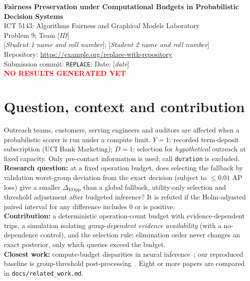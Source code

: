 \documentclass[11pt,a4paper]{article}
\newcommand{\fillin}[1]{\textnormal{[\textit{#1}]}}
\newcommand{\ProjectTitle}{Fairness Preservation under Computational Budgets in Probabilistic Decision Systems}
\newcommand{\resBanner}{\textcolor{red}{\textbf{NO RESULTS GENERATED YET}}}
\newcommand{\resEffectGlobal}{[pending]}\newcommand{\resEffectUtil}{[pending]}\newcommand{\resEffectThr}{[pending]}
\begin{document}
\begin{center}
{\Large\bfseries \ProjectTitle}\\[4pt]
ICT 5143: Algorithms Fairness and Graphical Models Laboratory\\
Problem 9; Team \fillin{ID}\\
\fillin{Student 1 name and roll number}; \fillin{Student 2 name and roll number}\\
{\small Repository: \url{https://example.org/replace-with-repository}\\
Submission commit: \texttt{REPLACE}; Date: \fillin{date}}\\[2pt]
\resBanner
\end{center}
\begin{abstract}
\noindent We ask whether a budget-aware fallback limits the fairness degradation that arises when exact inference in a nine-variable Bayesian network for pre-contact bank outreach is cut off by a deterministic operation budget. We compare fairness-aware fallback selection (validation worst-group decision deviation, AP loss $\le 0.01$) with a global fallback, utility-only selection and post-budget threshold adjustment. Primary result, paired block-bootstrap difference in $\Delta_{\mathrm{EOpp}}$ against the global fallback: \resEffectGlobal. Limits: synthetic masks, no customer identifiers, small network.
\end{abstract}

\section{Question, context and contribution}
Outreach teams, customers, serving engineers and auditors are affected when a probabilistic scorer is run under a compute limit. $Y=1$: recorded term-deposit subscription (UCI Bank Marketing); $D=1$: selection for \emph{hypothetical} outreach at fixed capacity. Only pre-contact information is used; call \texttt{duration} is excluded.\\
\textbf{Research question:} at a fixed operation budget, does selecting the fallback by validation worst-group deviation from the exact decision (subject to $\le0.01$ AP loss) give a smaller $\Delta_{\mathrm{EOpp}}$ than a global fallback, utility-only selection and threshold adjustment after budgeted inference? It is refuted if the Holm-adjusted paired interval for any difference includes $0$ or is positive.\\
\textbf{Contribution:} a deterministic operation-count budget with evidence-dependent trips, a simulation isolating \emph{group-dependent evidence availability} (with a no-dependence control), and the selection rule; elimination order never changes an exact posterior, only which queries exceed the budget.\\
\textbf{Closest work:} compute-budget disparities in neural inference~\cite{closest}; our reproduced baseline is group-threshold post-processing~\cite{method}. Eight or more papers are compared in \texttt{docs/related\_work.md}.
\end{document}
